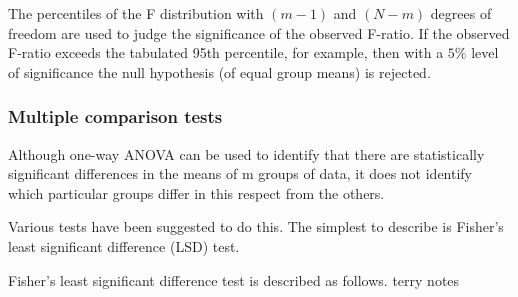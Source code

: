 \documentclass[12pt]{article}
\theoremstyle{break}
\begin{document}
The percentiles of the F distribution with $(m - 1)$ and $(N - m)$ degrees of freedom are used to judge the significance of the observed F-ratio. If the observed F-ratio exceeds the tabulated 95th percentile, for example, then with a $5\%$ level of significance the null hypothesis (of equal group means) is rejected.

\subsubsection{Multiple comparison tests}
Although one-way ANOVA can be used to identify that there are statistically significant differences in the means of m groups of data, it does not identify which particular groups differ in this respect from the others.

Various tests have been suggested to do this. The simplest to describe is Fisher's least significant difference (LSD) test.

\begin{mdframed}
Fisher's least significant difference test is described as follows.
\textcolor[rgb]{1.00,1.00,1.00}{terry notes\lipsum[1-7]}
\end{mdframed}
\end{document}
